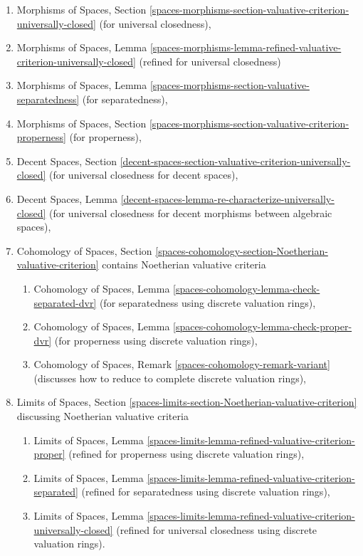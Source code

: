 \begin{enumerate}
\item Morphisms of Spaces, Section
\ref{spaces-morphisms-section-valuative-criterion-universally-closed}
(for universal closedness),
\item Morphisms of Spaces, Lemma
\ref{spaces-morphisms-lemma-refined-valuative-criterion-universally-closed}
(refined for universal closedness)
\item Morphisms of Spaces, Lemma
\ref{spaces-morphisms-section-valuative-separatedness}
(for separatedness),
\item Morphisms of Spaces, Section
\ref{spaces-morphisms-section-valuative-criterion-properness}
(for properness),
\item Decent Spaces, Section
\ref{decent-spaces-section-valuative-criterion-universally-closed}
(for universal closedness for decent spaces),
\item Decent Spaces, Lemma
\ref{decent-spaces-lemma-re-characterize-universally-closed}
(for universal closedness for decent morphisms between algebraic spaces),
\item Cohomology of Spaces, Section
\ref{spaces-cohomology-section-Noetherian-valuative-criterion}
contains Noetherian valuative criteria
\begin{enumerate}
\item Cohomology of Spaces, Lemma
\ref{spaces-cohomology-lemma-check-separated-dvr}
(for separatedness using discrete valuation rings),
\item Cohomology of Spaces, Lemma
\ref{spaces-cohomology-lemma-check-proper-dvr}
(for properness using discrete valuation rings),
\item Cohomology of Spaces, Remark
\ref{spaces-cohomology-remark-variant}
(discusses how to reduce to complete discrete valuation rings),
\end{enumerate}
\item Limits of Spaces, Section
\ref{spaces-limits-section-Noetherian-valuative-criterion}
discussing Noetherian valuative criteria
\begin{enumerate}
\item Limits of Spaces, Lemma
\ref{spaces-limits-lemma-refined-valuative-criterion-proper}
(refined for properness using discrete valuation rings),
\item Limits of Spaces, Lemma
\ref{spaces-limits-lemma-refined-valuative-criterion-separated}
(refined for separatedness using discrete valuation rings),
\item Limits of Spaces, Lemma
\ref{spaces-limits-lemma-refined-valuative-criterion-universally-closed}
(refined for universal closedness using discrete valuation rings).
\end{enumerate}
\end{enumerate}

